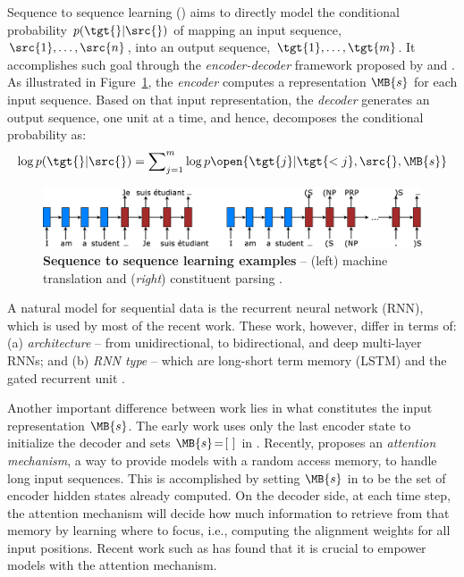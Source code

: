 Sequence to sequence learning (\ssl{}) aims to directly model the conditional
probability $p(\tgt{}|\src{})$ of mapping an input sequence,
$\src{1},\ldots,\src{n}$, into an output sequence, $\tgt{1},\ldots,\tgt{m}$.
It accomplishes such goal through the {\it encoder-decoder} framework proposed
by \citet{sutskever14} and \citet{cho14}. As illustrated in Figure~\ref{f:s2s},
the {\it encoder} computes a representation $\MB{s}$
for each input sequence. Based on that input representation,
the {\it decoder} generates an output sequence, one unit at a time, and hence, decomposes the conditional probability as:
\begin{equation}
\log p(\tgt{}|\src{}) = \sum_{j=1}^m \nolimits \log
p\open{\tgt{j}|\tgt{<j},\src{},\MB{s}}
\label{e:s2s}
\end{equation}


\begin{figure}%
\centering
\includegraphics[width=1\textwidth, clip=true, trim= 0 0 0
0]{img/6-1_seq2seq}
\caption{{\bf Sequence to sequence learning examples} -- (left) machine
translation \citep{sutskever14} and ({\it right}) constituent parsing
\citep{vinyals15grammar}.}
\label{f:s2s}
\end{figure}

A natural model for sequential data is the recurrent
neural network (RNN), which is used by most of the recent \ssl{} work.
These work,
however, differ in terms of: (a) {\it architecture} -- from unidirectional, to
bidirectional, and deep multi-layer RNNs; and (b) {\it RNN type} -- which are long-short term memory (LSTM)
\citep{lstm97} and the gated recurrent unit \citep{cho14}. 

Another important difference between \ssl{} work lies in what constitutes the
input representation $\MB{s}$.
The early \ssl{} work \citep{sutskever14,cho14,luong15,vinyals15caption} uses only the last encoder state
 to initialize the decoder and sets $\MB{s}\!=\![\text{ }]$ in %
. Recently, \citet{bog15} proposes an {\it attention mechanism}, a way
to provide \ssl{} models with a random access memory, to 
handle long input sequences.
This is accomplished by setting
$\MB{s}$ in  to be the set of encoder hidden states already computed. On the decoder side, at each time step, the attention mechanism will
decide how much information to retrieve from that memory by learning where to
focus, i.e., computing the alignment weights for all input positions. Recent work such as \citep{xu15,jean15,luong15attn,vinyals15grammar}
has found that it is crucial to empower \ssl{} models with the attention mechanism.

